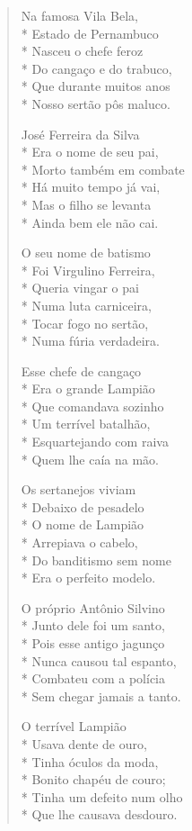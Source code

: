 \begin{verse}
Na famosa Vila Bela,\\*
Estado de Pernambuco\\*
Nasceu o chefe feroz\\*
Do cangaço e do trabuco,\\*
Que durante muitos anos\\*
Nosso sertão pôs maluco.

José Ferreira da Silva\\*
Era o nome de seu pai,\\*
Morto também em combate\\*
Há muito tempo já vai,\\*
Mas o filho se levanta\\*
Ainda bem ele não cai.

O seu nome de batismo\\*
Foi Virgulino Ferreira,\\*
Queria vingar o pai\\*
Numa luta carniceira,\\*
Tocar fogo no sertão,\\*
Numa fúria verdadeira.

Esse chefe de cangaço\\*
Era o grande Lampião\\*
Que comandava sozinho\\*
Um terrível batalhão,\\*
Esquartejando com raiva\\*
Quem lhe caía na mão.

Os sertanejos viviam\\*
Debaixo de pesadelo\\*
O nome de Lampião\\*
Arrepiava o cabelo,\\*
Do banditismo sem nome\\*
Era o perfeito modelo.

O próprio Antônio Silvino\\*
Junto dele foi um santo,\\*
Pois esse antigo jagunço \\*
Nunca causou tal espanto,\\*
Combateu com a polícia\\*
Sem chegar jamais a tanto.

O terrível Lampião\\*
Usava dente de ouro,\\*
Tinha óculos da moda,\\*
Bonito chapéu de couro;\\*
Tinha um defeito num olho\\*
Que lhe causava desdouro.


\end{verse}
